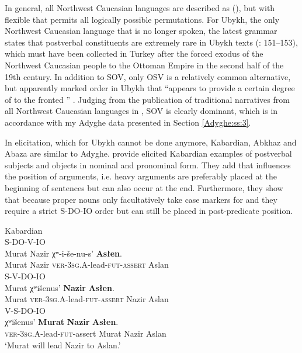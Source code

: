 \documentclass[output=paper,colorlinks,citecolor=brown, draft]{langscibook}
\begin{document}
\begin{sloppypar}
In general, all Northwest Caucasian languages are described as  (\citealt{arkadiev2021northwest}), but with flexible  that permits all logically possible permutations. For Ubykh, the only Northwest Caucasian language that is no longer spoken, the latest grammar states that postverbal constituents are extremely rare in Ubykh texts (\citealt{fenwick2011grammar}: 151--153), which must have been collected in Turkey after the forced exodus of the Northwest Caucasian people to the Ottoman Empire in the second half of the 19th century. In addition to SOV, only OSV is a relatively common alternative, but apparently marked order in Ubykh that ``appears to provide a certain degree of  to the fronted  '' \citep[151]{fenwick2011grammar}. Judging from the publication of traditional narratives from all Northwest Caucasian languages in \citet{colarusso1999north}, SOV is clearly dominant, which is in accordance with my Adyghe data presented in Section \ref{Adyghe:ss:3}.
\end{sloppypar}

In elicitation, which for Ubykh cannot be done anymore, Kabardian, Abkhaz and Abaza are similar to Adyghe. \citet[112--130]{kumakhov2009circassian} provide elicited Kabardian examples of postverbal subjects and objects in nominal and pronominal form. They add that  influences the position of arguments, i.e. heavy arguments are preferably placed at the beginning of sentences but can also occur at the end. Furthermore, they show that because proper nouns only facultatively take case markers for  and  they require a strict S-DO-IO order but can still be placed in post-predicate position. 

\ea
\ea\label{Adyghe:ex:46a}
Kabardian \citep[129]{kumakhov2009circassian} \\
S-DO-V-IO \\
\gll Murat Nazir χʷ-i-še-nu-s' \textbf{Asłen}. \\
Murat Nazir \textsc{ver-3sg.A}-lead\textsc{-fut-assert} Aslan \\
\ex\label{Adyghe:ex:46b}
S-V-DO-IO\\
\gll Murat χʷišenus' \textbf{Nazir} \textbf{Asłen}. \\
Murat \textsc{ver-3sg.A}-lead\textsc{-fut-assert} Nazir Aslan \\
\ex\label{Adyghe:ex:46c}
V-S-DO-IO\\
\gll χʷišenus' \textbf{Murat} \textbf{Nazir} \textbf{Asłen}. \\
\textsc{ver-3sg.A}-lead\textsc{-fut}-assert Murat Nazir Aslan \\
\glt `Murat will lead Nazir to Aslan.'
\z
\z
\end{document}
